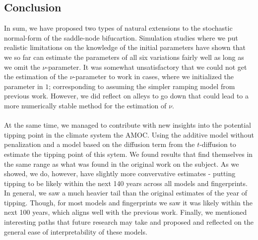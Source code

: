 \subsection{Conclusion}
In sum, we have proposed two types of natural extensions to the stochastic normal-form of the saddle-node bifucartion. Simulation studies where we put realistic limitations on the knowledge of the initial parameters have shown that we so far can estimate the parameters of all six variations fairly well as long as we omit the $\nu$-parameter. It was somewhat unsatisfactory that we could not get the estimation of the $\nu$-parameter to work in cases, where we initialized the parameter in $1$; corresponding to assuming the simpler ramping model from previous work. However, we did reflect on alleys to go down that could lead to a more numerically stable method for the estimation of $\nu$.\\\\
At the same time, we managed to contribute with new insights into the potential tipping point in the climate system the AMOC. Using the additive model without penalization and a model based on the diffusion term from the $t$-diffusion to estimate the tipping point of this sytem. We found results that find themselves in the same range as what was found in the original work on the subject. As we showed, we do, however, have slightly more convervative estimates - putting tipping to be likely within the next 140 years across all models and fingerprints. In general, we saw a much heavier tail than the original estimates of the year of tipping. Though, for most models and fingerprints we saw it was likely within the next 100 years, which aligns well with the previous work. Finally, we mentioned interesting paths that future research may take and proposed and reflected on the general ease of interpretability of these models. 